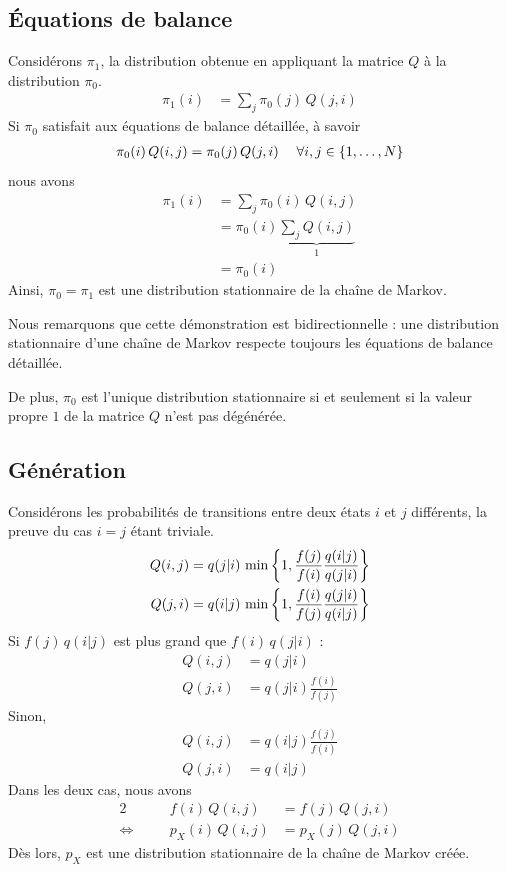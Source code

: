 \documentclass[a4paper, 12pt]{report}
\begin{document}
	\subsection{Équations de balance}
    Considérons $\pi_1$, la distribution obtenue en appliquant la matrice $Q$ à la distribution $\pi_0$.
	\begin{align*}
	    \pi_1(i) & = \sum_j \pi_0(j) \, Q(j, i)
	\end{align*}
	Si $\pi_0$ satisfait aux équations de balance détaillée, à savoir
	\begin{align}
        \pi_0(i) \, Q(i, j) & = \pi_0(j) \, Q(j, i) \; & \forall i, j \in \left\{1, \dots, N\right\}
    \end{align}
    nous avons
	\begin{align*}
	    \pi_1(i) & = \sum_j \pi_0(i) \, Q(i, j) \\
	    & = \pi_0(i) \underbrace{\sum_j Q(i, j)}_{1} \\
	    & = \pi_0(i)
	\end{align*}
	Ainsi, $\pi_0 = \pi_1$ est une distribution stationnaire de la chaîne de Markov. \par
	Nous remarquons que cette démonstration est bidirectionnelle : une distribution stationnaire d'une chaîne de Markov respecte toujours les équations de balance détaillée. \par
	De plus, $\pi_0$ est l'unique distribution stationnaire si et seulement si la valeur propre $1$ de la matrice $Q$ n'est pas dégénérée. \par
	\subsection{Génération}
    Considérons les probabilités de transitions entre deux états $i$ et $j$ différents, la preuve du cas $i = j$ étant triviale.
	\begin{align*}
	    Q(i, j) & = q(j | i) \, \min \left\{1, \frac{f(j)}{f(i)} \frac{q(i | j)}{q(j | i)}\right\} \\
	    Q(j, i) & = q(i | j) \, \min \left\{1, \frac{f(i)}{f(j)} \frac{q(j | i)}{q(i | j)}\right\}
	\end{align*}
	Si $f(j) \, q(i | j)$ est plus grand que $f(i) \, q(j | i)$ :
	\begin{align*}
	    Q(i, j) & = q(j | i) \\
	    Q(j, i) & = q(j | i) \frac{f(i)}{f(j)}
	\end{align*}
	Sinon,
	\begin{align*}
	    Q(i, j) & = q(i | j) \frac{f(j)}{f(i)} \\
	    Q(j, i) & = q(i | j)
	\end{align*}
    Dans les deux cas, nous avons
	\begin{alignat*}{2}
	    && f(i) \, Q(i, j) & = f(j) \, Q(j, i) \\
	    \Leftrightarrow \quad && p_X(i) \, Q(i, j) & = p_X(j) \, Q(j, i)
	\end{alignat*}
	Dès lors, $p_X$ est une distribution stationnaire de la chaîne de Markov créée.\par 
	
\end{document}
